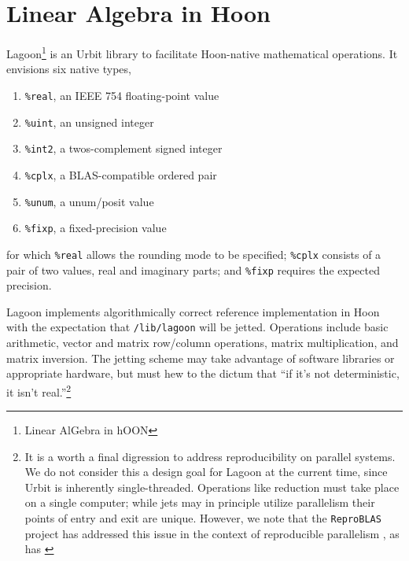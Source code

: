 \documentclass[twoside]{article}
\begin{document}
\section{Linear Algebra in Hoon}

Lagoon\footnote{Linear AlGebra in hOON} is an Urbit library to facilitate Hoon-native mathematical operations.  It envisions six native types,

\begin{enumerate}
  \item  \lstinline[style=inlinecode]{%real}, an IEEE 754 floating-point value
  \item  \lstinline[style=inlinecode]{%uint}, an unsigned integer
  \item  \lstinline[style=inlinecode]{%int2}, a twos-complement signed integer
  \item  \lstinline[style=inlinecode]{%cplx}, a BLAS-compatible ordered pair
  \item  \lstinline[style=inlinecode]{%unum}, a unum/posit value
  \item  \lstinline[style=inlinecode]{%fixp}, a fixed-precision value
\end{enumerate}

\noindent
for which \lstinline[style=inlinecode]{%real} allows the rounding mode to be specified; \lstinline[style=inlinecode]{%cplx} consists of a pair of two values, real and imaginary parts; and \lstinline[style=inlinecode]{%fixp} requires the expected precision.

Lagoon implements algorithmically correct reference implementation in Hoon with the expectation that \lstinline[style=inlinecode]{/lib/lagoon} will be jetted.  Operations include basic arithmetic, vector and matrix row/column operations, matrix multiplication, and matrix inversion.  The jetting scheme may take advantage of software libraries or appropriate hardware, but must hew to the dictum that “if it's not deterministic, it isn't real.”\footnote{It is a worth a final digression to address reproducibility on parallel systems.  We do not consider this a design goal for Lagoon at the current time, since Urbit is inherently single-threaded.  Operations like reduction must take place on a single computer; while jets may in principle utilize parallelism their points of entry and exit are unique.  However, we note that the \texttt{ReproBLAS} project has addressed this issue in the context of reproducible parallelism \citep{ReproBLAS}, as has \citeauthor{Chohra2016}}  %
\end{document}
